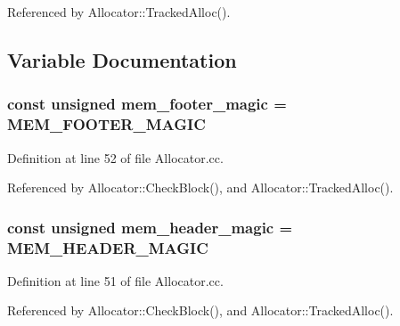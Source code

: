 Referenced by Allocator\-::\-Tracked\-Alloc().



\subsection{Variable Documentation}
\subsubsection[{mem\-\_\-footer\-\_\-magic}]{\setlength{\rightskip}{0pt plus 5cm}const unsigned mem\-\_\-footer\-\_\-magic = {\bf M\-E\-M\-\_\-\-F\-O\-O\-T\-E\-R\-\_\-\-M\-A\-G\-I\-C}}\label{_allocator_8cc_a89ab5016ef388d7a5691e4d77208cc32}


Definition at line 52 of file Allocator.\-cc.



Referenced by Allocator\-::\-Check\-Block(), and Allocator\-::\-Tracked\-Alloc().

\subsubsection[{mem\-\_\-header\-\_\-magic}]{\setlength{\rightskip}{0pt plus 5cm}const unsigned mem\-\_\-header\-\_\-magic = {\bf M\-E\-M\-\_\-\-H\-E\-A\-D\-E\-R\-\_\-\-M\-A\-G\-I\-C}}\label{_allocator_8cc_ac870dbfc709df78d9ee713843f55e894}


Definition at line 51 of file Allocator.\-cc.



Referenced by Allocator\-::\-Check\-Block(), and Allocator\-::\-Tracked\-Alloc().


